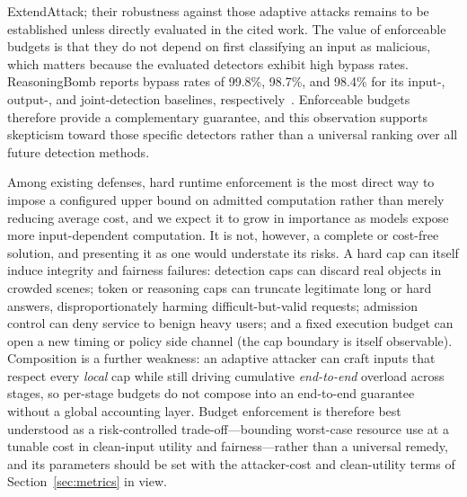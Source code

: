 \documentclass[acmsmall,screen,review,nonacm]{acmart}
\begin{document}
ExtendAttack; their robustness against those adaptive attacks remains to be established unless directly evaluated in the cited work. The value of enforceable budgets is that they do not depend on first classifying an input as malicious, which matters because the evaluated detectors exhibit high bypass rates. ReasoningBomb reports bypass rates of 99.8\%, 98.7\%, and 98.4\% for its input-, output-, and joint-detection baselines, respectively~\cite{liu2026reasoningbomb}. Enforceable budgets therefore provide a complementary guarantee, and this observation supports skepticism toward those specific detectors rather than a universal ranking over all future detection methods.

Among existing defenses, hard runtime enforcement is the most direct way to impose a configured upper bound on admitted computation rather than merely reducing average cost, and we expect it to grow in importance as models expose more input-dependent computation. It is not, however, a complete or cost-free solution, and presenting it as one would understate its risks. A hard cap can itself induce integrity and fairness failures: detection caps can discard real objects in crowded scenes; token or reasoning caps can truncate legitimate long or hard answers, disproportionately harming difficult-but-valid requests; admission control can deny service to benign heavy users; and a fixed execution budget can open a new timing or policy side channel (the cap boundary is itself observable). Composition is a further weakness: an adaptive attacker can craft inputs that respect every \emph{local} cap while still driving cumulative \emph{end-to-end} overload across stages, so per-stage budgets do not compose into an end-to-end guarantee without a global accounting layer. Budget enforcement is therefore best understood as a risk-controlled trade-off---bounding worst-case resource use at a tunable cost in clean-input utility and fairness---rather than a universal remedy, and its parameters should be set with the attacker-cost and clean-utility terms of Section~\ref{sec:metrics} in view.
\end{document}
